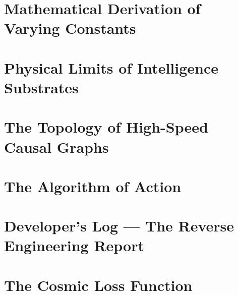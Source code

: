 \documentclass[11pt,a4paper,twoside]{book}
\begin{document}
\appendix

\chapter{Mathematical Derivation of Varying Constants}

\chapter{Physical Limits of Intelligence Substrates}

\chapter{The Topology of High-Speed Causal Graphs}

\chapter{The Algorithm of Action}

\chapter{Developer's Log --- The Reverse Engineering Report}

\chapter{The Cosmic Loss Function}


\backmatter






\end{document}
